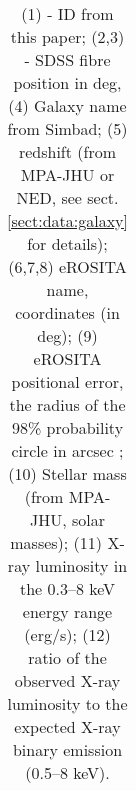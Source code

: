 \begin{longtable}{llllllllllll}
 \caption{(1) - ID from this paper; (2,3) - SDSS fibre position in deg, (4) Galaxy name from Simbad; (5) redshift (from MPA-JHU or NED, see sect. \ref{sect:data:galaxy} for details); (6,7,8) eROSITA name, coordinates (in deg); (9) eROSITA positional error, the radius of the 98\% probability circle in arcsec ; (10) Stellar mass (from MPA-JHU, solar masses); (11)  X-ray luminosity in the 0.3--8 keV energy range (erg/s); (12) ratio of the observed X-ray luminosity to the expected X-ray binary emission (0.5--8 keV). }
\end{longtable}
